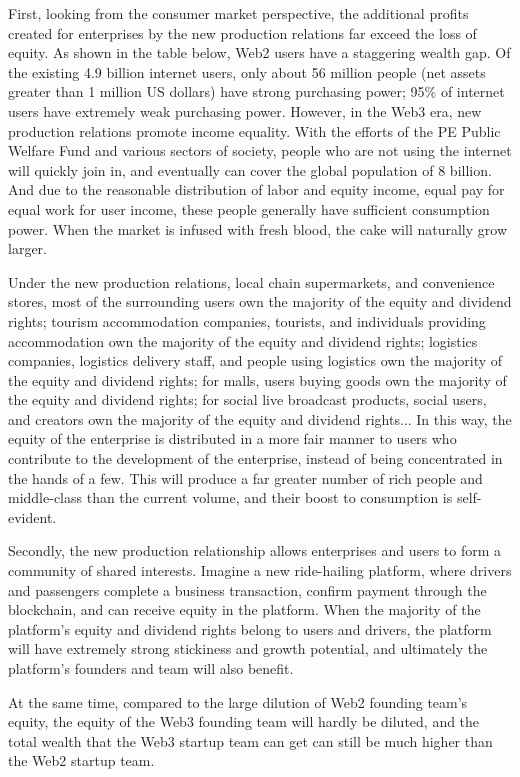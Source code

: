 \documentclass{article}
\begin{document}
First, looking from the consumer market perspective, the additional profits created for enterprises by the new production relations far exceed the loss of equity. As shown in the table below, Web2 users have a staggering wealth gap. Of the existing 4.9 billion internet users, only about 56 million people (net assets greater than 1 million US dollars) have strong purchasing power; 95\% of internet users have extremely weak purchasing power. However, in the Web3 era, new production relations promote income equality. With the efforts of the PE Public Welfare Fund and various sectors of society, people who are not using the internet will quickly join in, and eventually can cover the global population of 8 billion. And due to the reasonable distribution of labor and equity income, equal pay for equal work for user income, these people generally have sufficient consumption power. When the market is infused with fresh blood, the cake will naturally grow larger.


Under the new production relations, local chain supermarkets, and convenience stores, most of the surrounding users own the majority of the equity and dividend rights; tourism accommodation companies, tourists, and individuals providing accommodation own the majority of the equity and dividend rights; logistics companies, logistics delivery staff, and people using logistics own the majority of the equity and dividend rights; for malls, users buying goods own the majority of the equity and dividend rights; for social live broadcast products, social users, and creators own the majority of the equity and dividend rights... In this way, the equity of the enterprise is distributed in a more fair manner to users who contribute to the development of the enterprise, instead of being concentrated in the hands of a few. This will produce a far greater number of rich people and middle-class than the current volume, and their boost to consumption is self-evident.

Secondly, the new production relationship allows enterprises and users to form a community of shared interests. Imagine a new ride-hailing platform, where drivers and passengers complete a business transaction, confirm payment through the blockchain, and can receive equity in the platform. When the majority of the platform's equity and dividend rights belong to users and drivers, the platform will have extremely strong stickiness and growth potential, and ultimately the platform's founders and team will also benefit.

At the same time, compared to the large dilution of Web2 founding team's equity, the equity of the Web3 founding team will hardly be diluted, and the total wealth that the Web3 startup team can get can still be much higher than the Web2 startup team.
\end{document}
